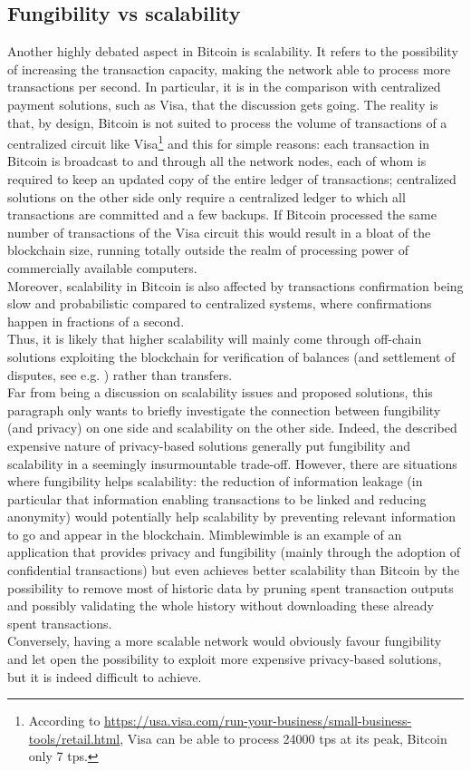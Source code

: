 \subsection{Fungibility vs scalability}
Another highly debated aspect in Bitcoin is scalability. It refers to the possibility of increasing the transaction capacity, making the network able to process more transactions per second. In particular, it is in the comparison with centralized payment solutions, such as Visa, that the discussion gets going. The reality is that, by design, Bitcoin is not suited to process the volume of transactions of a centralized circuit like Visa\footnote{According to \url{https://usa.visa.com/run-your-business/small-business-tools/retail.html}, Visa can be able to process 24000 tps at its peak, Bitcoin only 7 tps.} and this for simple reasons: each transaction in Bitcoin is broadcast to and through all the network nodes, each of whom is required to keep an updated copy of the entire ledger of transactions; centralized solutions on the other side only require a centralized ledger to which all transactions are committed and a few backups. If Bitcoin processed the same number of transactions of the Visa circuit this would result in a bloat of the blockchain size, running totally outside the realm of processing power of commercially available computers. \\
Moreover, scalability in Bitcoin is also affected by transactions confirmation being slow and probabilistic compared to centralized systems, where confirmations happen in fractions of a second.\\ Thus, it is likely that higher scalability will mainly come through off-chain solutions exploiting the blockchain for verification of balances (and settlement of disputes, see e.g. \cite{RefWork:18}) rather than transfers.\\
Far from being a discussion on scalability issues and proposed solutions, this paragraph only wants to briefly investigate the connection between fungibility (and privacy) on one side and scalability on the other side. Indeed, the described expensive nature of privacy-based solutions generally put fungibility and scalability in a seemingly insurmountable trade-off. However, there are situations where fungibility helps scalability: the reduction of information leakage (in particular that information enabling transactions to be linked and reducing anonymity) would potentially help scalability by preventing relevant information to go and appear in the blockchain. Mimblewimble \cite{MW} is an example of an application that provides privacy and fungibility (mainly through the adoption of confidential transactions) but even achieves better scalability than Bitcoin by the possibility to remove most of historic data by pruning spent transaction outputs and possibly validating the whole history without downloading these already spent transactions.\\
Conversely, having a more scalable network would obviously favour fungibility and let open the possibility to exploit more expensive privacy-based solutions, but it is indeed difficult to achieve.